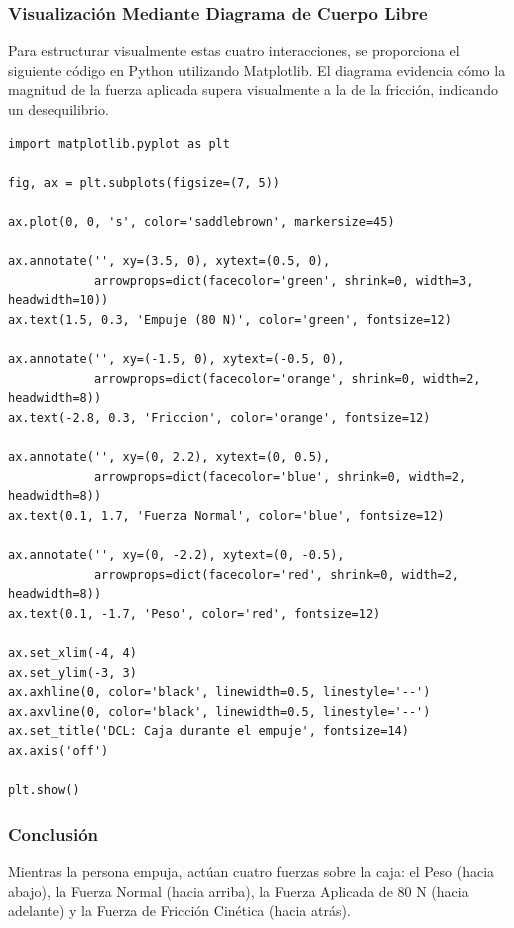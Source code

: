 \documentclass[12pt]{article}
\begin{document}
\subsubsection*{Visualización Mediante Diagrama de Cuerpo Libre}
Para estructurar visualmente estas cuatro interacciones, se proporciona el siguiente código en Python utilizando Matplotlib. El diagrama evidencia cómo la magnitud de la fuerza aplicada supera visualmente a la de la fricción, indicando un desequilibrio.

\begin{lstlisting}
import matplotlib.pyplot as plt

fig, ax = plt.subplots(figsize=(7, 5))

ax.plot(0, 0, 's', color='saddlebrown', markersize=45)

ax.annotate('', xy=(3.5, 0), xytext=(0.5, 0), 
            arrowprops=dict(facecolor='green', shrink=0, width=3, headwidth=10))
ax.text(1.5, 0.3, 'Empuje (80 N)', color='green', fontsize=12)

ax.annotate('', xy=(-1.5, 0), xytext=(-0.5, 0), 
            arrowprops=dict(facecolor='orange', shrink=0, width=2, headwidth=8))
ax.text(-2.8, 0.3, 'Friccion', color='orange', fontsize=12)

ax.annotate('', xy=(0, 2.2), xytext=(0, 0.5), 
            arrowprops=dict(facecolor='blue', shrink=0, width=2, headwidth=8))
ax.text(0.1, 1.7, 'Fuerza Normal', color='blue', fontsize=12)

ax.annotate('', xy=(0, -2.2), xytext=(0, -0.5), 
            arrowprops=dict(facecolor='red', shrink=0, width=2, headwidth=8))
ax.text(0.1, -1.7, 'Peso', color='red', fontsize=12)

ax.set_xlim(-4, 4)
ax.set_ylim(-3, 3)
ax.axhline(0, color='black', linewidth=0.5, linestyle='--')
ax.axvline(0, color='black', linewidth=0.5, linestyle='--')
ax.set_title('DCL: Caja durante el empuje', fontsize=14)
ax.axis('off')

plt.show()
\end{lstlisting}

\subsubsection*{Conclusión}
Mientras la persona empuja, actúan cuatro fuerzas sobre la caja: el Peso (hacia abajo), la Fuerza Normal (hacia arriba), la Fuerza Aplicada de 80 N (hacia adelante) y la Fuerza de Fricción Cinética (hacia atrás).

\newpage
\end{document}
